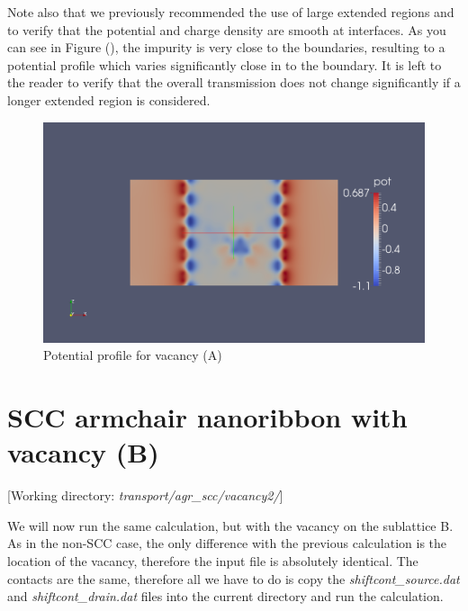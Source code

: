\documentclass[a4paper,11pt,english]{sphinxmanual}
\begin{document}
{{Note also that we previously recommended the use of large extended
regions and to verify that the potential and charge density are smooth
at interfaces. As you can see in Figure {\hyperref[transport:fig-clip-vac-pot]{\emph{}}} (), the
impurity is very close to the boundaries, resulting to a potential
profile which varies significantly close in to the boundary. It is
left to the reader to verify that the overall transmission does not
change significantly if a longer extended region is considered.
\begin{figure}[htbp]
\centering
\capstart
\includegraphics[width=0.700\linewidth]{clip_vac_pot.png}
\caption{Potential profile for vacancy (A)}\label{transport:fig-clip-vac-pot}\end{figure}

\newpage
\section{SCC armchair nanoribbon with vacancy (B)}
\label{transport:scc-armchair-nanoribbon-with-vacancy-b}
{[}Working directory: \emph{transport/agr\_scc/vacancy2/}{]}

We will now run the same calculation, but with the vacancy on the
sublattice B. As in the non-SCC case, the only difference with the
previous calculation is the location of the vacancy, therefore the
input file is absolutely identical. The contacts are the same,
therefore all we have to do is copy the \emph{shiftcont\_source.dat} and
\emph{shiftcont\_drain.dat} files into the current directory and run the
calculation.

}}
\end{document}
